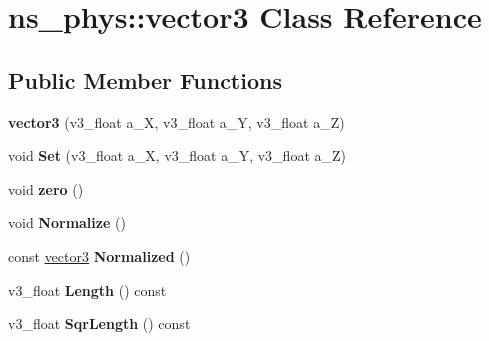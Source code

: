 \hypertarget{classns__phys_1_1vector3}{}\section{ns\+\_\+phys\+:\+:vector3 Class Reference}
\label{classns__phys_1_1vector3}
\subsection*{Public Member Functions}
\begin{DoxyCompactItemize}
\item 
{\bfseries vector3} (v3\+\_\+float a\+\_\+X, v3\+\_\+float a\+\_\+Y, v3\+\_\+float a\+\_\+Z)\hypertarget{classns__phys_1_1vector3_a2cbf2588287dd950c8131326d51ce505}{}\label{classns__phys_1_1vector3_a2cbf2588287dd950c8131326d51ce505}

\item 
void {\bfseries Set} (v3\+\_\+float a\+\_\+X, v3\+\_\+float a\+\_\+Y, v3\+\_\+float a\+\_\+Z)\hypertarget{classns__phys_1_1vector3_a3c61a5eb9bb9d48163bf7d1e8e05f37b}{}\label{classns__phys_1_1vector3_a3c61a5eb9bb9d48163bf7d1e8e05f37b}

\item 
void {\bfseries zero} ()\hypertarget{classns__phys_1_1vector3_a925ad5d9f57a9de6312d5081e5264c2e}{}\label{classns__phys_1_1vector3_a925ad5d9f57a9de6312d5081e5264c2e}

\item 
void {\bfseries Normalize} ()\hypertarget{classns__phys_1_1vector3_a2edbb620de8ea30d63a3e1c0035e7298}{}\label{classns__phys_1_1vector3_a2edbb620de8ea30d63a3e1c0035e7298}

\item 
const \hyperlink{classns__phys_1_1vector3}{vector3} {\bfseries Normalized} ()\hypertarget{classns__phys_1_1vector3_acecc0ee7625729b5ace1d5e596326d61}{}\label{classns__phys_1_1vector3_acecc0ee7625729b5ace1d5e596326d61}

\item 
v3\+\_\+float {\bfseries Length} () const \hypertarget{classns__phys_1_1vector3_a071dbac61424501b85063b2c3c1f5c22}{}\label{classns__phys_1_1vector3_a071dbac61424501b85063b2c3c1f5c22}

\item 
v3\+\_\+float {\bfseries Sqr\+Length} () const \hypertarget{classns__phys_1_1vector3_aec6467bb76d86a03438a36ef82c15aa0}{}\label{classns__phys_1_1vector3_aec6467bb76d86a03438a36ef82c15aa0}


\end{DoxyCompactItemize}
